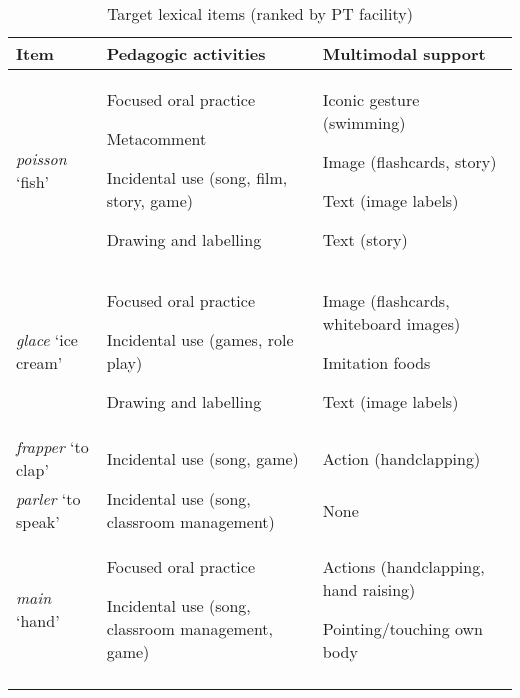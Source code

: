\documentclass[output=paper]{langscibook}
\begin{document}
\begin{table}
\caption{Target lexical items (ranked by PT facility)}
    \begin{tabularx}{\textwidth}{lQQ}
    \lsptoprule
    {Item} &	{Pedagogic activities} & 	{Multimodal support}\\
    \midrule
    \textit{poisson} `fish' &	Focused oral practice

                                Metacomment
                                
                                Incidental use (song, film, story, game)
                                
                                Drawing and labelling &	Iconic gesture (swimming)
        
                                                        Image (flashcards, story)

                                                        Text (image labels)
                                
                                                        Text (story)\\
    \tablevspace
    \textit{glace} `ice cream' &	Focused oral practice
    
                                    Incidental use (games, role play)
                                    
                                    Drawing and labelling &	Image (flashcards, whiteboard images)

                                                            Imitation foods

                                                            Text (image labels)\\
    \tablevspace
    \textit{frapper} `to clap' &	Incidental use (song, game)	& Action (handclapping)\\
    \tablevspace
    \textit{parler} `to speak' &	Incidental use (song, classroom management)	& None\\
    \tablevspace
    \textit{main} `hand' &	Focused oral practice
    
                Incidental use (song, classroom management, game) &	Actions (handclapping, hand raising)

                                                            Pointing/touching own body\\
    \lspbottomrule
    \end{tabularx}
\end{table}
\end{document}
